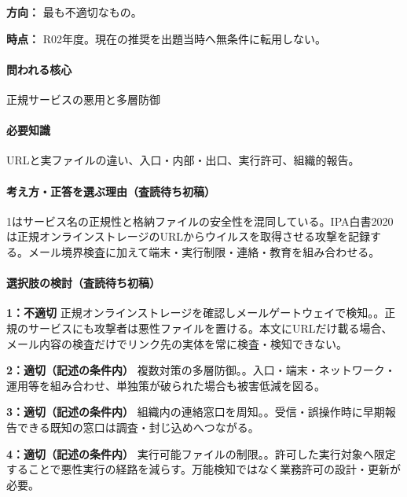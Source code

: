 \noindent\textbf{方向：} 最も不適切なもの。\par

\noindent\textbf{時点：} R02年度。現在の推奨を出題当時へ無条件に転用しない。\par

\paragraph{問われる核心} 正規サービスの悪用と多層防御

\paragraph{必要知識} URLと実ファイルの違い、入口・内部・出口、実行許可、組織的報告。

\paragraph{考え方・正答を選ぶ理由（査読待ち初稿）} 1はサービス名の正規性と格納ファイルの安全性を混同している。IPA白書2020は正規オンラインストレージのURLからウイルスを取得させる攻撃を記録する。メール境界検査に加えて端末・実行制限・連絡・教育を組み合わせる。

\paragraph{選択肢の検討（査読待ち初稿）}\mbox{}\par

\noindent\textbf{1：不適切} 正規オンラインストレージを確認しメールゲートウェイで検知。。正規のサービスにも攻撃者は悪性ファイルを置ける。本文にURLだけ載る場合、メール内容の検査だけでリンク先の実体を常に検査・検知できない。\par

\noindent\textbf{2：適切（記述の条件内）} 複数対策の多層防御。。入口・端末・ネットワーク・運用等を組み合わせ、単独策が破られた場合も被害低減を図る。\par

\noindent\textbf{3：適切（記述の条件内）} 組織内の連絡窓口を周知。。受信・誤操作時に早期報告できる既知の窓口は調査・封じ込めへつながる。\par

\noindent\textbf{4：適切（記述の条件内）} 実行可能ファイルの制限。。許可した実行対象へ限定することで悪性実行の経路を減らす。万能検知ではなく業務許可の設計・更新が必要。\par

